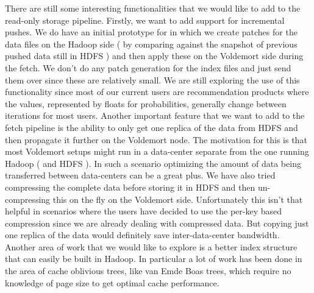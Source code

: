 \documentclass[10pt,twocolumn,preprint,natbib,authoryear]{sigplanconf}
\begin{document}
There are still some interesting functionalities that we would like to add to the read-only storage pipeline. Firstly, we want to add support for incremental pushes. We do have an initial prototype for in which we create patches for the data files on the Hadoop side ( by comparing against the snapshot of previous pushed data still in HDFS ) and then apply these on the Voldemort side during the fetch. We don't do any patch generation for the index files and just send them over since these are relatively small. We are still exploring the use of this functionality since most of our current users are recommendation products where the values, represented by floats for probabilities, generally change between iterations for most users. Another important feature that we want to add to the fetch pipeline is the ability to only get one replica of the data from HDFS and then propagate it further on the Voldemort node. The motivation for this is that most Voldemort setups might run in a data-center separate from the one running Hadoop ( and HDFS ). In such a scenario optimizing the amount of data being transferred between data-centers can be a great plus. We have also tried compressing the complete data before storing it in HDFS and then un-compressing this on the fly on the Voldemort side. Unfortunately this isn't that helpful in scenarios where the users have decided to use the per-key based compression since we are already dealing with compressed data. But copying just one replica of the data would definitely save inter-data-center bandwidth. Another area of work that we would like to explore is a better index structure that can easily be built in Hadoop. In particular a lot of work has been done in the area of cache oblivious trees, like van Emde Boas trees, which require no knowledge of page size to get optimal cache performance. 
 
\acks



    
\end{document}

